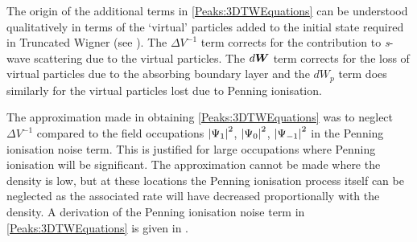 The origin of the additional terms in \eqref{Peaks:3DTWEquations} can be understood qualitatively in terms of the `virtual' particles added to the initial state required in Truncated Wigner (see ). The $\Delta V^{-1}$ term corrects for the contribution to \emph{s}-wave scattering due to the virtual particles. The $d \bm{W}$ term corrects for the loss of virtual particles due to the absorbing boundary layer and the $dW_p$ term does similarly for the virtual particles lost due to Penning ionisation.

The approximation made in obtaining \eqref{Peaks:3DTWEquations} was to neglect $\Delta V^{-1}$ compared to the field occupations $\left|\Psi_1\right|^2$, $\left|\Psi_0\right|^2$, $\left|\Psi_{-1}\right|^2$ in the Penning ionisation noise term. This is justified for large occupations where Penning ionisation will be significant. The approximation cannot be made where the density is low, but at these locations the Penning ionisation process itself can be neglected as the associated rate will have decreased proportionally with the density. A derivation of the Penning ionisation noise term in \eqref{Peaks:3DTWEquations} is given in .

\parasep

